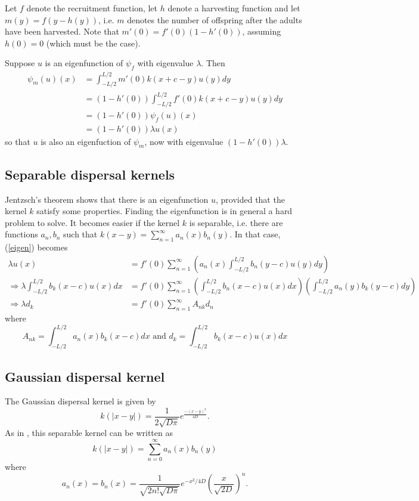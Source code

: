 \documentclass[12pt,english]{article}
\begin{document}
Let $f$ denote the recruitment function, let $h$ denote a harvesting function and let $m(y)=f(y-h(y))$, i.e. $m$ denotes the number of offspring after the adults have been harvested.  Note that $m'(0)=f'(0)(1-h'(0))$, assuming $h(0)=0$ (which must be the case).

Suppose $u$ is an eigenfunction of $\psi_f$ with eigenvalue $\lambda$.  Then 
\begin{align*}
\psi_m(u)(x)&=\int_{-L/2}^{L/2}m'(0)k(x+c-y)u(y)dy
\\&=(1-h'(0))\int_{-L/2}^{L/2}f'(0)k(x+c-y)u(y)dy
\\&=(1-h'(0))\psi_f(u)(x)
\\&=(1-h'(0))\lambda u(x)
\end{align*}
so that $u$ is also an eigenfuction of $\psi_m$, now with eigenvalue $(1-h'(0))\lambda$.

\subsection{Separable dispersal kernels }
Jentzsch's theorem shows that there is an eigenfunction $u$, provided that the kernel $k$ satisfy some properties.  Finding the eigenfunction is in general a hard problem to solve.  It becomes easier if the kernel $k$ is separable, i.e. there are functions $a_n,b_n$ such that $k(x-y)=\sum_{n=1}^\infty a_n(x)b_n(y)$.  In that case, (\ref{eigen}) becomes
\begin{align*}
\lambda u(x)&=f'(0)\sum_{n=1}^\infty\left( a_n(x)\int_{-L/2}^{L/2}b_n(y-c)u(y)dy\right)
\\ \Rightarrow \lambda\int_{-L/2}^{L/2}b_k(x-c)u(x)dx&=f'(0)\sum_{n=1}^{\infty}\left(\int_{-L/2}^{L/2}b_n(x-c)u(x)dx\right)\left(\int_{-L/2}^{L/2}a_n(y)b_k(y-c)dy\right)
\\ \Rightarrow \lambda d_k&=f'(0)\sum_{n=1}^\infty A_{nk}d_n  \tag{**} \label{problem}
\end{align*}
where
\begin{equation*}
A_{nk}=\int_{-L/2}^{L/2}a_n(x)b_k(x-c)dx \text{ and } d_k=\int_{-L/2}^{L/2}b_k(x-c)u(x)dx
\end{equation*}

\subsection{Gaussian dispersal kernel }
The Gaussian dispersal kernel is given by
$$k(|x-y|)=\frac{1}{2\sqrt{D\pi}}e^{\frac{-(x-y)^2}{4D}}.$$
As in \citep{Latore:1998fk}, this separable kernel can be written as
$$k(|x-y|)=\sum_{n=0}^\infty a_n(x)b_n(y)$$
where
$$a_n(x)=b_n(x)=\frac{1}{\sqrt{2n!\sqrt{D\pi}}}e^{-x^2/4D}\left(\frac{x}{\sqrt{2D}}\right)^n.$$
\end{document}
